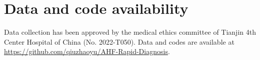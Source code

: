 \section{Data and code availability}\label{Data and code availability}
Data collection has been approved by the medical ethics committee of Tianjin 4th Center Hospital of China (No. 2022-T050). Data and codes are available at \href{https://github.com/qiuzhaoyu/AHF-Rapid-Diagnosis}{https://github.com/qiuzhaoyu/AHF-Rapid-Diagnosis}.